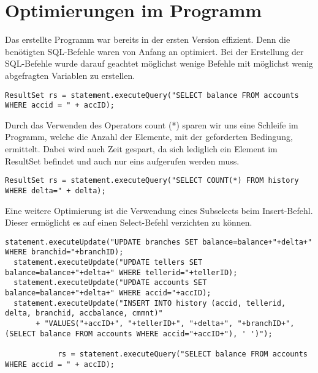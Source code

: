 \section{Optimierungen im Programm}
Das erstellte Programm war bereits in der ersten Version effizient. Denn die
benötigten SQL-Befehle waren von Anfang an optimiert. Bei der Erstellung der
SQL-Befehle wurde darauf geachtet möglichst wenige Befehle mit möglichst wenig
abgefragten Variablen zu erstellen.
\begin{lstlisting}[caption={Statement der Funktion kontostandTX in
TXHandler.java}] 
   ResultSet rs = statement.executeQuery("SELECT balance FROM accounts WHERE accid = " + accID);
\end{lstlisting}

Durch das Verwenden des Operators count (*) sparen wir uns eine Schleife im
Programm, welche die Anzahl der Elemente, mit der geforderten Bedingung,
ermittelt. Dabei wird auch Zeit gespart, da sich lediglich ein Element im
ResultSet befindet und auch nur eins aufgerufen werden muss. 
\begin{lstlisting}[caption={Statement der Funktion analyseTX in
TXHandler.java}] 
  ResultSet rs = statement.executeQuery("SELECT COUNT(*) FROM history WHERE delta=" + delta);
\end{lstlisting}
 
Eine weitere Optimierung ist die Verwendung eines Subselects beim Insert-Befehl.
Dieser ermöglicht es auf einen Select-Befehl verzichten zu können.
\begin{lstlisting}[caption={Statement der Funktion einzahlungTX in
TXHandler.java}] 
  statement.executeUpdate("UPDATE branches SET balance=balance+"+delta+" WHERE branchid="+branchID);
  statement.executeUpdate("UPDATE tellers SET balance=balance+"+delta+" WHERE tellerid="+tellerID);
  statement.executeUpdate("UPDATE accounts SET balance=balance+"+delta+" WHERE accid="+accID);
  statement.executeUpdate("INSERT INTO history (accid, tellerid, delta, branchid, accbalance, cmmnt)"
       + "VALUES("+accID+", "+tellerID+", "+delta+", "+branchID+", (SELECT balance FROM accounts WHERE accid="+accID+"), ' ')");
            
            rs = statement.executeQuery("SELECT balance FROM accounts WHERE accid = " + accID);
\end{lstlisting}

